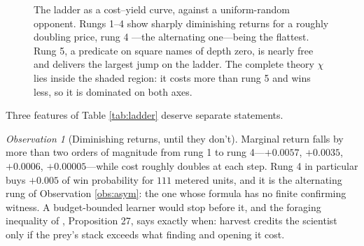 \documentclass[11pt]{article}
\theoremstyle{definition}
\theoremstyle{plain}
\theoremstyle{remark}
\newtheorem{observation}[definition]{Observation}
\begin{document}
\begin{figure}[h]
\centering
{}
\caption{The ladder as a cost--yield curve, against a uniform-random opponent.
Rungs 1--4 show sharply diminishing returns for a roughly doubling price, rung 4
---the alternating one---being the flattest. Rung 5, a predicate on square names
of depth zero, is nearly free and delivers the largest jump on the ladder. The complete theory $\chi$ lies inside the shaded
region: it costs more than rung 5 and wins less, so it is dominated on both
axes.}
\label{fig:pareto}
\end{figure}

Three features of Table \ref{tab:ladder} deserve separate statements.

\begin{observation}[Diminishing returns, until they don't]
Marginal return falls by more than two orders of magnitude from rung 1 to rung
4---$+0.0057$, $+0.0035$, $+0.0006$, $+0.00005$---while cost roughly doubles at
each step. Rung 4 in particular buys $+0.005$ of win probability for $111$
metered units, and it is the alternating rung of Observation \ref{obs:asym}: the
one whose formula has no finite confirming witness. A budget-bounded learner
would stop before it, and the foraging
inequality of \cite{scientist}, Proposition 27, says exactly when: harvest
credits the scientist only if the prey's stack exceeds what finding and opening
it cost.
\end{observation}
\end{document}
